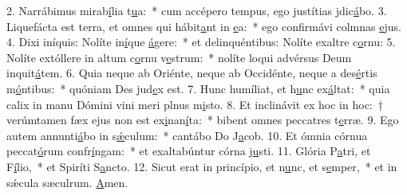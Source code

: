 2. Narrábimus mirab\uline{í}lia t\uline{u}a:~* cum accépero tempus, ego justítias jdic\uline{á}bo.
3. Liquefácta est terra, et omnes qui hábit\uline{a}nt in \uline{e}a:~* ego confirmávi colmnas \uline{e}jus.
4. Dixi iníquis: Nolíte in\uline{í}que \uline{á}gere:~* et delinquéntibus: Nolíte exaltre c\uline{o}rnu:
5. Nolíte extóllere in altum c\uline{o}rnu v\uline{e}strum:~* nolíte loqui advérsus Deum inquit\uline{á}tem.
6. Quia neque ab Oriénte, neque ab Occidénte, neque a des\uline{é}rtis m\uline{ó}ntibus:~* quóniam Des jud\uline{e}x est.
7. Hunc humíliat, et h\uline{u}nc ex\uline{á}ltat:~* quia calix in manu Dómini vini meri plnus m\uline{i}sto.
8. Et inclinávit ex hoc in hoc:~† verúmtamen fæx ejus non est ex\uline{i}nan\uline{í}ta:~* bibent omnes peccatres t\uline{e}rræ.
9. Ego autem annunti\uline{á}bo in s\uline{ǽ}culum:~* cantábo Do J\uline{a}cob.
10. Et ómnia córnua peccat\uline{ó}rum confr\uline{í}ngam:~* et exaltabúntur córna j\uline{u}sti.
11. Glória P\uline{a}tri, et F\uline{í}lio,~* et Spiríti S\uline{a}ncto.
12. Sicut erat in princípio, et n\uline{u}nc, et s\uline{e}mper,~* et in sǽcula sæculrum. \uline{A}men.

